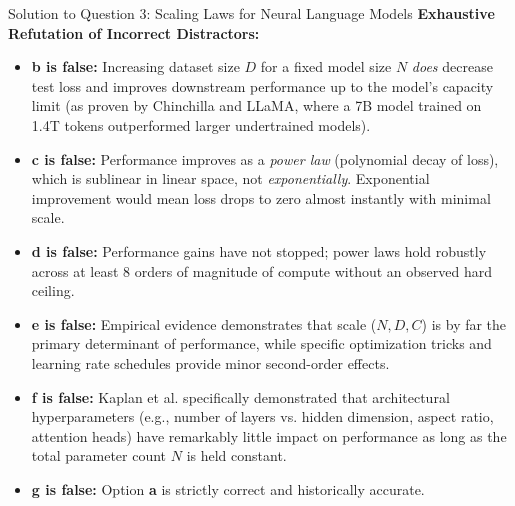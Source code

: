 \documentclass[11pt,a4paper]{article}
\begin{document}
\begin{solutionbox}{Solution to Question 3: Scaling Laws for Neural Language Models}
\medskip
\noindent
\textbf{Exhaustive Refutation of Incorrect Distractors:}
\begin{itemize}[leftmargin=1.5em]
    \item \textbf{b is false:} Increasing dataset size $D$ for a fixed model size $N$ \emph{does} decrease test loss and improves downstream performance up to the model's capacity limit (as proven by Chinchilla and LLaMA, where a 7B model trained on 1.4T tokens outperformed larger undertrained models).
    \item \textbf{c is false:} Performance improves as a \emph{power law} (polynomial decay of loss), which is sublinear in linear space, not \emph{exponentially}. Exponential improvement would mean loss drops to zero almost instantly with minimal scale.
    \item \textbf{d is false:} Performance gains have not stopped; power laws hold robustly across at least 8 orders of magnitude of compute without an observed hard ceiling.
    \item \textbf{e is false:} Empirical evidence demonstrates that scale ($N, D, C$) is by far the primary determinant of performance, while specific optimization tricks and learning rate schedules provide minor second-order effects.
    \item \textbf{f is false:} Kaplan et al. specifically demonstrated that architectural hyperparameters (e.g., number of layers vs. hidden dimension, aspect ratio, attention heads) have remarkably little impact on performance as long as the total parameter count $N$ is held constant.
    \item \textbf{g is false:} Option \textbf{a} is strictly correct and historically accurate.
\end{itemize}
\end{solutionbox}

\vspace{1.5em}
\end{document}
